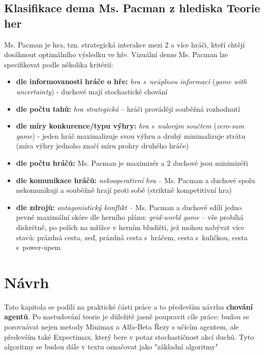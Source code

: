 \section{Klasifikace dema Ms. Pacman z hlediska Teorie her}
Ms. Pacman je hra, tzn. strategická interakce mezi 2 a více hráči, kteří chtějí dosáhnout optimálního výsledku ve hře.
Vizuální demo Ms. Pacman lze specifikovat podle několika kritérií:
\begin{itemize}
\item \textbf{dle informovanosti hráče o hře:} \textit{hra s neúplnou informací} (\textit{game with uncertainty}) - duchové mají stochastické chování
\item \textbf{dle počtu tahů:} \textit{hra strategická} – hráči provádějí souběžná rozhodnutí
\item \textbf{dle míry konkurence/typu výhry:} \textit{hra s nulovým součtem} (\textit{zero-sum game})  - jeden hráč maximalizuje svou výhru a druhý minimalizuje ztrátu (míra výhry jednoho značí míru prohry druhého hráče)
\item \textbf{dle počtu hráčů:} Ms. Pacman je maximizér a 2 duchové jsou minimizéři
\item \textbf{dle komunikace hráčů:} \textit{nekooperativní hra} – Ms. Pacman a duchové spolu nekomunikují a souběžně hrají proti sobě (striktně kompetitivní hra)
\item \textbf{dle zdrojů:} \textit{antagonistický konflikt} – Ms. Pacman a duchové sdílí jedno pevné maximální skóre
dle herního plánu: \textit{grid-world game} – vše probíhá diskrétně, po polích na mřížce v herním bludišti, jež mohou nabývat více stavů: prázdná cesta, zeď, prázdná cesta s hráčem, cesta s kuličkou, cesta s power-upem
\end{itemize}
\chapter{Návrh}
Tato kapitola se podílí na praktické části práce a to především návrhu \textbf{chování agentů}.
Po nastudování teorie je důležité jasně poupravit cíle práce: budou se porovnávat nejen metody Minimax a Alfa-Beta Řezy s učícím agentem, ale především také Expectimax, který bere v potaz stochastičnost akcí duchů. Tyto algoritmy se budou dále v textu označovat jako "základní algoritmy"

